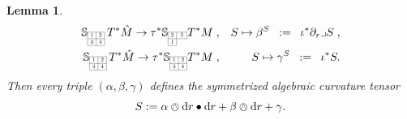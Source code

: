 \documentclass[11pt,a4paper]{article}
\theoremstyle{plain}
\newtheorem{lemma}{Lemma}
\theoremstyle{remark}
\renewcommand{\d}{\mathrm{d}}
\newcommand{\bbS}{\mathbb{S}}
\def\pd{\partial}
\begin{document}
\begin{lemma}
\begin{eqnarray}
\bbS_{\scaleto{\begin{array}{|c|c|}
\cline{1-2}
1 & 2 \\
\cline{1-2}
3 & 4 \\
\cline{1-2}
\end{array}}{12pt}}\, T^*\hat M\to \tau^*\bbS_{\scaleto{\begin{array}{|c|c|}
\cline{1-2}
2 & 3 \\
\cline{1-2}
1  & \multicolumn{1}{c}{\;\;\;}\\
\cline{1-1} 
\end{array}}{12pt}}T^*M \;,& & S \mapsto \beta^S  \;\;:= \;\; \iota^* \pd_r \lrcorner S\;,\\
\bbS_{\scaleto{\begin{array}{|c|c|}
\cline{1-2}
1 & 2 \\
\cline{1-2}
3 & 4 \\
\cline{1-2}
\end{array}}{12pt}}\, T^*\hat M \to \tau^*\bbS_{\scaleto{\begin{array}{|c|c|}
\cline{1-2}
1 & 2 \\
\cline{1-2}
3  & 4\\
\cline{1-2} 
\end{array}}{12pt}}T^*M \;,& & S\mapsto \gamma^S  \;\;:= \;\; \iota^*S.
 \end{eqnarray}
Then every triple $(\alpha,\beta,\gamma)$ defines the symmetrized algebraic curvature tensor 
\begin{equation}\label{eq:S_explizit}
S :=   \alpha \owedge\d r \bullet \d r + \beta \owedge\d r + \gamma.
\end{equation}
\end{lemma}
\end{document}

